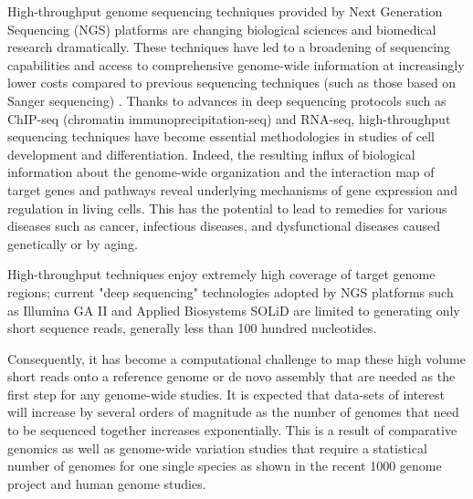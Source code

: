 \documentclass{sig-alternate}
\begin{document}


High-throughput genome sequencing techniques provided by Next
Generation Sequencing (NGS) platforms are changing biological sciences
and biomedical research dramatically\cite{mardis2008-tig,mardis2008-arghg}. These techniques have led to a
broadening of sequencing capabilities and access to comprehensive
genome-wide information at increasingly lower costs compared to
previous sequencing techniques (such as those based on Sanger
sequencing)
\cite{metzker2010,mardis2008-tig,mardis2008-arghg,gilad2009,mortazavi2008,sorek2010}.
Thanks to advances in deep sequencing protocols such as ChIP-seq (chromatin immunoprecipitation-seq)
 and RNA-seq, high-throughput
sequencing techniques have become essential methodologies in studies
of cell development and
differentiation\cite{wang2009-natrevgen,pepke2009,gilad2009,mortazavi2008,sorek2010}.
Indeed, the resulting influx of biological information about the
genome-wide organization and the interaction map of target genes and
pathways reveal underlying mechanisms of gene expression and
regulation in living cells. This has the potential to lead to
remedies for various diseases such as cancer, infectious diseases, and
dysfunctional diseases caused genetically or by
aging\cite{amaral2008,encode2007,baek2008,costa2009}.


High-throughput techniques enjoy extremely high coverage of target
genome regions; current "deep sequencing"
technologies adopted by NGS platforms such as Illumina GA II
and Applied Biosystems SOLiD are limited to generating only short
sequence reads, generally less than 100 hundred
nucleotides\cite{metzker2010}.

Consequently, it has become a computational challenge to map these
high volume short reads onto a reference genome or de novo assembly
that are needed as the first step for any genome-wide
studies\cite{alex2009,trapnell2009,scheibye-alsing2009,pop2002,hernandez2008,farrer2008}.
It is expected that data-sets of interest will increase by several
orders of magnitude as the number of genomes that need to be sequenced
together increases exponentially.  This is a result of comparative
genomics as well as genome-wide variation studies that require a
statistical number of genomes for one single species as shown in the
recent 1000 genome project and human genome
studies\cite{1000genome,mardis2008-tig,gilad2009,alex2009,kim2011}.
\end{document}
